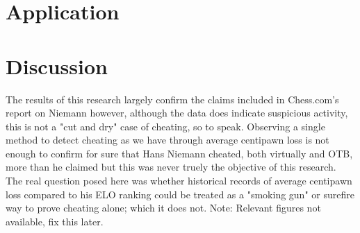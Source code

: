 \documentclass[12pt, letterpaper, titlepage]{article}
\begin{document}

\section*{Application}
\label{sec:app}


\section*{Discussion}
\label{sec:disc}

The results of this research largely confirm the claims included in Chess.com's report on Niemann however, although the data does indicate suspicious activity, this is not a "cut and dry" case of cheating, so to speak. Observing a single method to detect cheating as we have through average centipawn loss is not enough to confirm for sure that Hans Niemann cheated, both virtually and OTB, more than he claimed but this was never truely the objective of this research. The real question posed here was whether historical records of average centipawn loss compared to his ELO ranking could be treated as a "smoking gun" or surefire way to prove cheating alone; which it does not. Note: Relevant figures not available, fix this later. 



\end{document}
